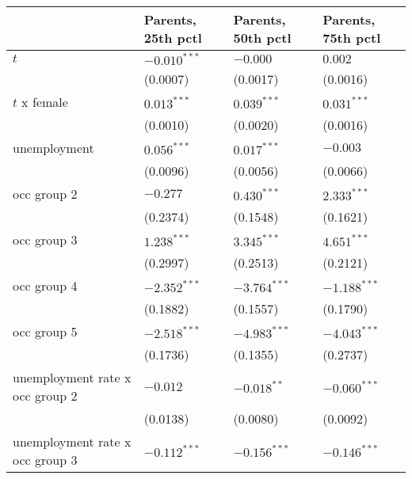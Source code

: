 \begin{tabular}{llll}
\toprule
{} & Parents, 25th pctl & Parents, 50th pctl & Parents, 75th pctl \\
\midrule
$t$                                      &     $-0.010^{***}$ &           $-0.000$ &            $0.002$ \\
                                         &           (0.0007) &           (0.0017) &           (0.0016) \\
$t$ x female                             &      $0.013^{***}$ &      $0.039^{***}$ &      $0.031^{***}$ \\
                                         &           (0.0010) &           (0.0020) &           (0.0016) \\
unemployment                             &      $0.056^{***}$ &      $0.017^{***}$ &           $-0.003$ \\
                                         &           (0.0096) &           (0.0056) &           (0.0066) \\
occ group 2                              &           $-0.277$ &      $0.430^{***}$ &      $2.333^{***}$ \\
                                         &           (0.2374) &           (0.1548) &           (0.1621) \\
occ group 3                              &      $1.238^{***}$ &      $3.345^{***}$ &      $4.651^{***}$ \\
                                         &           (0.2997) &           (0.2513) &           (0.2121) \\
occ group 4                              &     $-2.352^{***}$ &     $-3.764^{***}$ &     $-1.188^{***}$ \\
                                         &           (0.1882) &           (0.1557) &           (0.1790) \\
occ group 5                              &     $-2.518^{***}$ &     $-4.983^{***}$ &     $-4.043^{***}$ \\
                                         &           (0.1736) &           (0.1355) &           (0.2737) \\
unemployment rate x occ group 2          &           $-0.012$ &      $-0.018^{**}$ &     $-0.060^{***}$ \\
                                         &           (0.0138) &           (0.0080) &           (0.0092) \\
unemployment rate x occ group 3          &     $-0.112^{***}$ &     $-0.156^{***}$ &     $-0.146^{***}$ \\

\end{tabular}
